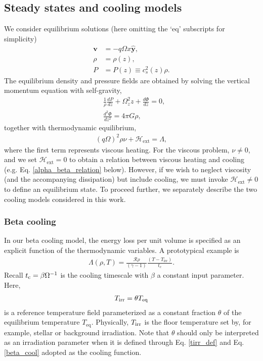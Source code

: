 \subsection{Steady states and cooling models}
We consider equilibrium solutions (here omitting the `eq' subscripts
for simplicity)  
\begin{align}
  \bm{v} &= -q\Omega x \hat{\bm{y}}, \\
  \rho   &= \rho(z),\\
  P      &= P(z) \equiv c_s^2(z)\rho.
\end{align} 
The equilibrium density and pressure fields are obtained by solving
the vertical momentum equation with self-gravity,
\begin{align}
  &\frac{1}{\rho}\frac{dP}{dz} +
  \Omega_z^2z + \frac{d\Phi}{dz} = 0, \label{vert_eq1}\\
 &\frac{d^2\Phi}{dz^2} = 4 \pi G \rho,\label{vert_eq2}
\end{align}
together with thermodynamic equilibrium,
\begin{align}\label{thermal_eq}
(q\Omega)^2\rho\nu + \mathcal{H}_\mathrm{ext} = \Lambda,
\end{align}
where the first term represents viscous heating. For the viscous
problem, $\nu\neq0$, and we set $\mathcal{H}_\mathrm{ext}=0$ to 
obtain a relation between viscous heating and cooling 
(e.g. Eq. \ref{alpha_beta_relation} below). However,
if we wish to neglect viscosity (and the accompanying dissipation) but include cooling, we must invoke
$\mathcal{H}_\mathrm{ext}\neq0$ to define an equilibrium state.  
To proceed further, we separately describe the two cooling models
considered in this work. 



\subsubsection{Beta cooling}\label{beta_cool_model}
In our beta cooling model, the energy loss per unit volume is specified  
as an explicit function of the thermodynamic variables. 
A prototypical example is 
\begin{align}\label{beta_cool}
  \Lambda(\rho, T) =
  \frac{\mathcal{R}\rho}{(\gamma-1)}\frac{\left(T-T_\mathrm{irr}\right)}{t_c}. 
\end{align}
Recall  $t_\mathrm{c} = \beta\Omega^{-1}$ is 
the cooling timescale with $\beta$ a constant input parameter. Here, 
\begin{align}\label{tirr_def}
  T_\mathrm{irr} = \theta T_\mathrm{eq}
\end{align}
is a reference temperature field parameterized as a constant 
fraction $\theta$ of the equilibrium temperature
$T_\mathrm{eq}$. Physically, $T_\mathrm{irr}$ is the floor temperature set by,
for example, stellar or background irradiation. Note that $\theta$  
should only be interpreted as an irradiation parameter when it is 
defined through Eq. \ref{tirr_def} and 
Eq. \ref{beta_cool} adopted as the cooling function. 

